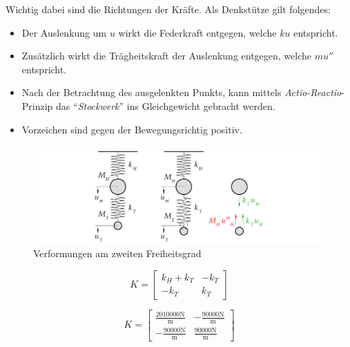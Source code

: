 \documentclass[
  letterpaper,
  DIV=11]{scrreprt}
\providecommand{\tightlist}{%
  \setlength{\itemsep}{0pt}\setlength{\parskip}{0pt}}\usepackage{longtable,booktabs,array}
\begin{document}
Wichtig dabei sind die Richtungen der Kräfte. Als Denkstütze gilt
folgendes:

\begin{itemize}
\tightlist
\item
  Der Auslenkung um \(u\) wirkt die Federkraft entgegen, welche \(k u\)
  entspricht.
\item
  Zusätzlich wirkt die Trägheitskraft der Auslenkung entgegen, welche
  \(m u''\) entspricht.
\item
  Nach der Betrachtung des ausgelenkten Punkts, kann mittels
  \emph{Actio-Reactio}-Prinzip das ``\emph{Stockwerk}'' ins
  Gleichgewicht gebracht werden.
\item
  Vorzeichen sind gegen der Bewegungsrichtig positiv.
\end{itemize}

\begin{figure}[H]

{\centering \includegraphics{index_files/mediabag/bilder/aufgabe_mms_tilg_auslenk1.pdf}

}

\caption{\label{fig-mms_tilg_auslenkung_2}Verformungen am zweiten
Freiheitsgrad}

\end{figure}

\begin{equation}K = \left[\begin{matrix}k_{H} + k_{T} & - k_{T}\\- k_{T} & k_{T}\end{matrix}\right]\end{equation}

\begin{equation}K = \left[\begin{matrix}\frac{2010000 \text{N}}{\text{m}} & - \frac{90000 \text{N}}{\text{m}}\\- \frac{90000 \text{N}}{\text{m}} & \frac{90000 \text{N}}{\text{m}}\end{matrix}\right]\end{equation}
\end{document}
